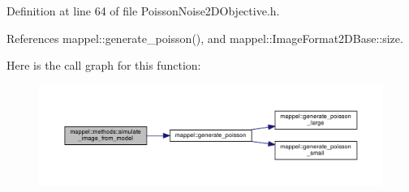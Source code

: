 Definition at line 64 of file Poisson\+Noise2\+D\+Objective.\+h.



References mappel\+::generate\+\_\+poisson(), and mappel\+::\+Image\+Format2\+D\+Base\+::size.



Here is the call graph for this function\+:\nopagebreak
\begin{figure}[H]
\begin{center}
\leavevmode
\includegraphics[width=350pt]{namespacemappel_1_1methods_a2dd4cb94fa6669d64488ed95bc1c6d02_cgraph}
\end{center}
\end{figure}


